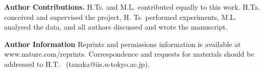 \documentclass[footinbib,amsmath,amssymb,superscriptaddress,twocolumn]{revtex4}
\begin{document}
\noindent
{\bf Author Contributions.} H.Ts. and M.L. contributed equally to this work. 
H.Ta. conceived and supervised the project, H. Ts. performed experiments, M.L. analysed the data, and all authors discussed and wrote the manuscript. 

\noindent
{\bf Author Information} Reprints and permissions information is available at www.nature.com/reprints.
Correspondence and requests for materials should be addressed to H.T. ~(tanaka@iis.u-tokyo.ac.jp).




\clearpage


\clearpage
\end{document}
